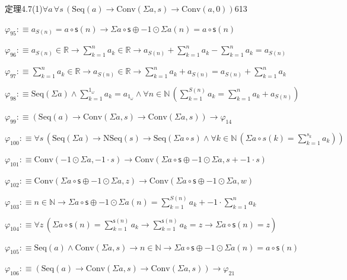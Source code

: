 \begin{fullproof}{定理4.7(1)}{$\forall a\,\forall s\,(\mathrm{Seq}(a) \to \mathrm{Conv}(\Sigma a,s) \to \mathrm{Conv}(a,0))$}{613}
\begin{abbrevlist}
\item $\varphi_{95} :\equiv a_{S(n)} = a \circ \mathsf{s}(n) \to \Sigma a \circ \mathsf{s} \oplus -1 \odot \Sigma a(n) = a \circ \mathsf{s}(n)$
\item $\varphi_{96} :\equiv a_{S(n)} \in \mathbb{R} \to {\textstyle\sum_{k=1}^{n} a_{k}} \in \mathbb{R} \to a_{S(n)} + {\textstyle\sum_{k=1}^{n} a_{k}} - {\textstyle\sum_{k=1}^{n} a_{k}} = a_{S(n)}$
\item $\varphi_{97} :\equiv {\textstyle\sum_{k=1}^{n} a_{k}} \in \mathbb{R} \to a_{S(n)} \in \mathbb{R} \to {\textstyle\sum_{k=1}^{n} a_{k}} + a_{S(n)} = a_{S(n)} + {\textstyle\sum_{k=1}^{n} a_{k}}$
\item $\varphi_{98} :\equiv \mathrm{Seq}(\Sigma a) \land {\textstyle\sum_{k=1}^{1_{\omega}} a_{k}} = a_{1_{\omega}} \land \forall n \in \mathbb{N}\,({\textstyle\sum_{k=1}^{S(n)} a_{k}} = {\textstyle\sum_{k=1}^{n} a_{k}} + a_{S(n)})$
\item $\varphi_{99} :\equiv (\mathrm{Seq}(a) \to \mathrm{Conv}(\Sigma a,s) \to \mathrm{Conv}(\Sigma a,s)) \to \varphi_{14}$
\item $\varphi_{100} :\equiv \forall s\,(\mathrm{Seq}(\Sigma a) \to \mathrm{NSeq}(s) \to \mathrm{Seq}(\Sigma a \circ s) \land \forall k \in \mathbb{N}\,(\Sigma a \circ s(k) = {\textstyle\sum_{k=1}^{s_{k}} a_{k}}))$
\item $\varphi_{101} :\equiv \mathrm{Conv}(-1 \odot \Sigma a,-1 \cdot s) \to \mathrm{Conv}(\Sigma a \circ \mathsf{s} \oplus -1 \odot \Sigma a,s + -1 \cdot s)$
\item $\varphi_{102} :\equiv \mathrm{Conv}(\Sigma a \circ \mathsf{s} \oplus -1 \odot \Sigma a,z) \to \mathrm{Conv}(\Sigma a \circ \mathsf{s} \oplus -1 \odot \Sigma a,w)$
\item $\varphi_{103} :\equiv n \in \mathbb{N} \to \Sigma a \circ \mathsf{s} \oplus -1 \odot \Sigma a(n) = {\textstyle\sum_{k=1}^{S(n)} a_{k}} + -1 \cdot {\textstyle\sum_{k=1}^{n} a_{k}}$
\item $\varphi_{104} :\equiv \forall z\,(\Sigma a \circ \mathsf{s}(n) = {\textstyle\sum_{k=1}^{\mathsf{s}(n)} a_{k}} \to {\textstyle\sum_{k=1}^{\mathsf{s}(n)} a_{k}} = z \to \Sigma a \circ \mathsf{s}(n) = z)$
\item $\varphi_{105} :\equiv \mathrm{Seq}(a) \land \mathrm{Conv}(\Sigma a,s) \to n \in \mathbb{N} \to \Sigma a \circ \mathsf{s} \oplus -1 \odot \Sigma a(n) = a \circ \mathsf{s}(n)$
\item $\varphi_{106} :\equiv (\mathrm{Seq}(a) \to \mathrm{Conv}(\Sigma a,s) \to \mathrm{Conv}(\Sigma a,s)) \to \varphi_{21}$

\end{abbrevlist}
\end{fullproof}
